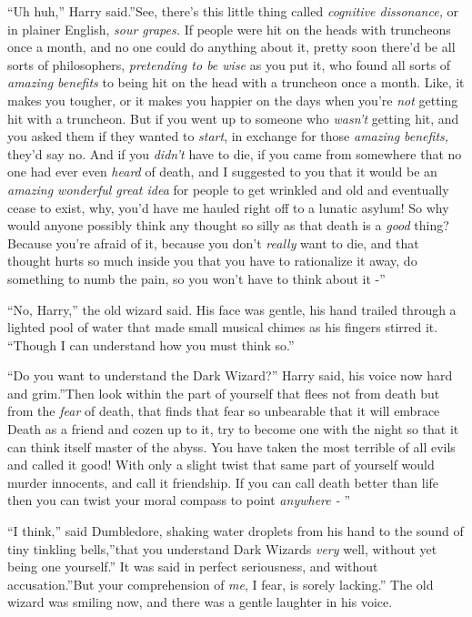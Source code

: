 ``Uh huh,'' Harry said.''See, there's this little thing called
\emph{cognitive dissonance,} or in plainer English, \emph{sour grapes.}
If people were hit on the heads with truncheons once a month, and no one
could do anything about it, pretty soon there'd be all sorts of
philosophers, \emph{pretending to be wise} as you put it, who found all
sorts of \emph{amazing benefits} to being hit on the head with a
truncheon once a month. Like, it makes you tougher, or it makes you
happier on the days when you're \emph{not} getting hit with a truncheon.
But if you went up to someone who \emph{wasn't} getting hit, and you
asked them if they wanted to \emph{start}, in exchange for those
\emph{amazing benefits,} they'd say no. And if you \emph{didn't} have to
die, if you came from somewhere that no one had ever even \emph{heard}
of death, and I suggested to you that it would be an \emph{amazing
wonderful great idea} for people to get wrinkled and old and eventually
cease to exist, why, you'd have me hauled right off to a lunatic asylum!
So why would anyone possibly think any thought so silly as that death is
a \emph{good} thing? Because you're afraid of it, because you don't
\emph{really} want to die, and that thought hurts so much inside you
that you have to rationalize it away, do something to numb the pain, so
you won't have to think about it -''

``No, Harry,'' the old wizard said. His face was gentle, his hand
trailed through a lighted pool of water that made small musical chimes
as his fingers stirred it. ``Though I can understand how you must think
so.''

``Do you want to understand the Dark Wizard?'' Harry said, his voice now
hard and grim.''Then look within the part of yourself that flees not
from death but from the \emph{fear} of death, that finds that fear so
unbearable that it will embrace Death as a friend and cozen up to it,
try to become one with the night so that it can think itself master of
the abyss. You have taken the most terrible of all evils and called it
good! With only a slight twist that same part of yourself would murder
innocents, and call it friendship. If you can call death better than
life then you can twist your moral compass to point \emph{anywhere -} ''

``I think,'' said Dumbledore, shaking water droplets from his hand to
the sound of tiny tinkling bells,''that you understand Dark Wizards
\emph{very} well, without yet being one yourself.'' It was said in
perfect seriousness, and without accusation.''But your comprehension of
\emph{me}, I fear, is sorely lacking.'' The old wizard was smiling now,
and there was a gentle laughter in his voice.

